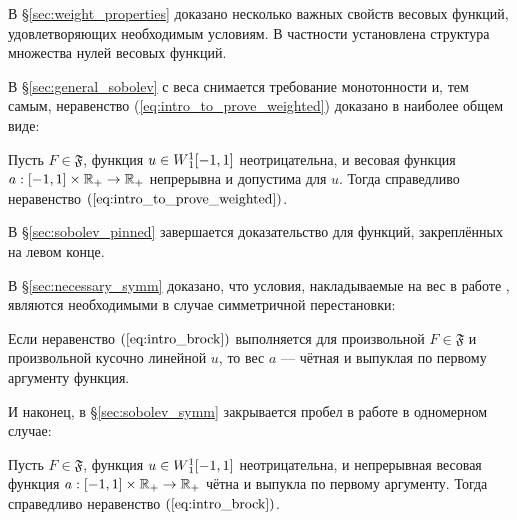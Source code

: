 В \S\ref{sec:weight_properties} доказано несколько важных свойств весовых функций, удовлетворяющих необходимым условиям.
В частности установлена структура множества нулей весовых функций.

В \S\ref{sec:general_sobolev} с веса снимается требование монотонности и, тем самым,
неравенство (\ref{eq:intro_to_prove_weighted}) доказано в наиболее общем виде:

\begin{thm}
Пусть $F \in \mathfrak{F}$, функция $u \in W{}_1^1[-1, 1]$ неотрицательна,
и весовая функция $a: [-1, 1] \times \mathbb R_+ \to \mathbb R_+$ непрерывна
и допустима для $u$.
Тогда справедливо неравенство $(\ref{eq:intro_to_prove_weighted})$.
\end{thm}

В \S\ref{sec:sobolev_pinned} завершается доказательство для функций, закреплённых на левом конце.

В \S\ref{sec:necessary_symm} доказано, что условия, накладываемые на вес в работе \cite{Brock},
являются необходимыми в случае симметричной перестановки:

\begin{thm}
Если неравенство $(\ref{eq:intro_brock})$ выполняется для произвольной $F \in \mathfrak{F}$ и произвольной кусочно линейной $u$,
то вес $a$ --- чётная и выпуклая по первому аргументу функция.
\end{thm}

И наконец, в \S\ref{sec:sobolev_symm} закрывается пробел в работе \cite{Brock} в одномерном случае:
\begin{thm}
Пусть $F \in \mathfrak{F}$, функция $u \in W{}_1^1[-1, 1]$ неотрицательна,
и непрерывная весовая функция $a: [-1, 1] \times \mathbb R_+ \to \mathbb R_+$ чётна и выпукла по первому аргументу.
Тогда справедливо неравенство $(\ref{eq:intro_brock})$.
\end{thm}



